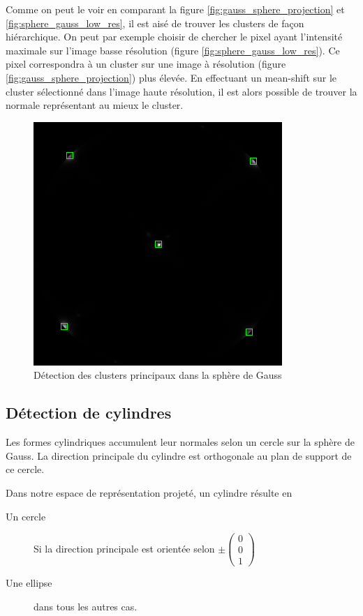 \documentclass{article}
\begin{document}
Comme on peut le voir en comparant la figure \ref{fig:gauss_sphere_projection} et \ref{fig:sphere_gauss_low_res}, il est aisé de trouver les clusters de façon hiérarchique. On peut par exemple choisir de chercher le pixel ayant l'intensité maximale sur l'image basse résolution (figure \ref{fig:sphere_gauss_low_res}). Ce pixel correspondra à un cluster sur une image à résolution (figure \ref{fig:gauss_sphere_projection}) plus élevée. En effectuant un mean-shift sur le cluster sélectionné dans l'image haute résolution, il est alors possible de trouver la normale représentant au mieux le cluster.

\begin{figure}[H]
\centering
\includegraphics[width=.5\columnwidth]{../blob.png}
\caption{Détection des clusters principaux dans la sphère de Gauss}
\label{fig:clusters_gauss}
\end{figure}


\subsection{Détection de cylindres}
Les formes cylindriques accumulent leur normales selon un cercle sur la sphère de Gauss. La direction principale du cylindre est orthogonale au plan de support de ce cercle.

Dans notre espace de représentation projeté, un cylindre résulte en
\begin{description}
\item[Un cercle] Si la direction principale est orientée selon $\pm \left(\begin{array}{l}0\\0\\1\end{array}\right)$
\item[Une ellipse] dans tous les autres cas.
\end{description}
\end{document}
